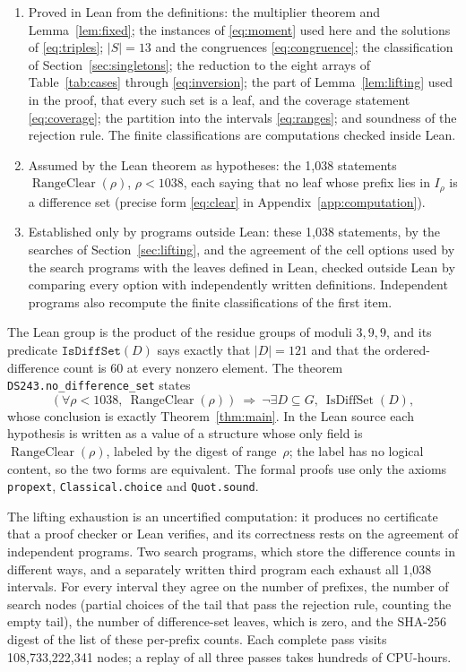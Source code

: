 \documentclass[11pt]{article}
\begin{document}
\begin{enumerate}
\item Proved in Lean from the definitions: the multiplier theorem and
Lemma~\ref{lem:fixed}; the instances of \eqref{eq:moment} used here and
the solutions of \eqref{eq:triples}; $|S|=13$ and the congruences
\eqref{eq:congruence}; the classification of
Section~\ref{sec:singletons}; the reduction to the eight arrays of
Table~\ref{tab:cases} through \eqref{eq:inversion};
the part of Lemma~\ref{lem:lifting} used in the proof, that every such
set is a leaf, and the coverage statement \eqref{eq:coverage};
the partition into the intervals \eqref{eq:ranges}; and soundness of the
rejection rule. The finite classifications are computations checked
inside Lean.
\item Assumed by the Lean theorem as hypotheses: the 1,038 statements
$\operatorname{RangeClear}(\rho)$, $\rho<1038$, each saying that no leaf whose
prefix lies in $I_\rho$ is a difference set (precise form
\eqref{eq:clear} in Appendix~\ref{app:computation}).
\item Established only by programs outside Lean: these 1,038
statements, by the searches of Section~\ref{sec:lifting}, and the
agreement of the cell options used by the search programs with the
leaves defined in Lean, checked outside Lean by comparing every option
with independently written definitions. Independent programs also recompute the finite
classifications of the first item.
\end{enumerate}

The Lean group is the product of the residue groups of moduli $3,9,9$,
and its predicate $\texttt{IsDiffSet}(D)$ says exactly that $|D|=121$
and that the ordered-difference count is 60 at every nonzero element.
The theorem \texttt{DS243.no\_difference\_set} states
\[
 \left(\forall \rho<1038,\
   \operatorname{RangeClear}(\rho)\right)
 \ \Longrightarrow\
 \neg\exists D\subseteq G,\ \operatorname{IsDiffSet}(D),
\]
whose conclusion is exactly Theorem~\ref{thm:main}. In the Lean source
each hypothesis is written as a value of a structure whose only field is
$\operatorname{RangeClear}(\rho)$, labeled by the digest of range~$\rho$; the
label has no logical content, so the two forms are equivalent. The
formal proofs use only the axioms \texttt{propext},
\texttt{Classical.choice} and \texttt{Quot.sound}.

The lifting exhaustion is an uncertified computation: it produces no
certificate that a proof checker or Lean verifies, and its correctness
rests on the agreement of independent programs. Two search programs,
which store the difference counts in different ways, and a separately
written third program each exhaust all 1,038 intervals. For every
interval they agree on the number of prefixes, the number of search
nodes (partial choices of the tail that pass the rejection rule,
counting the empty tail), the number of difference-set leaves, which is zero, and the
SHA-256 digest of the list of these per-prefix counts. Each complete
pass visits 108,733,222,341 nodes; a replay of all three passes takes
hundreds of CPU-hours.
\end{document}
